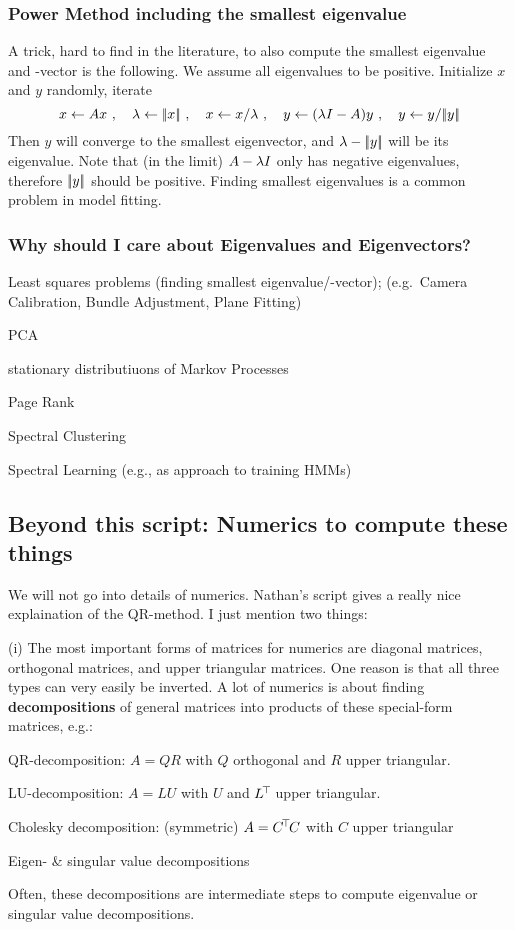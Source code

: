\subsubsection{Power Method including the smallest eigenvalue}

A trick, hard to find in the literature, to also compute the smallest
eigenvalue and -vector is the following. We assume all eigenvalues to
be positive. Initialize $x$ and $y$ randomly,
iterate
\begin{equation}
 x \gets A x ~,\quad \lambda\gets|\!|x|\!| ~,\quad x\gets x/\lambda ~,\quad y\gets(\lambda I - A)
 y ~,\quad y\gets y/|\!|y|\!|
\end{equation}
Then $y$ will converge to the smallest eigenvector, and $\lambda-|\!|y|\!|$
will be its eigenvalue. Note that (in the limit) $A-\lambda I$
only has negative eigenvalues, therefore $|\!|y|\!|$ should be
positive. Finding smallest eigenvalues is a common problem in model fitting.


\subsubsection{Why should I care about Eigenvalues and Eigenvectors?}

\begin{items}
\item Least squares problems (finding smallest eigenvalue/-vector);
(e.g.\ Camera Calibration, Bundle Adjustment, Plane Fitting)
\item PCA
\item stationary distributiuons of Markov Processes
\item Page Rank
\item Spectral Clustering
\item Spectral Learning (e.g., as approach to training HMMs)
\end{items}

\subsection{Beyond this script: Numerics to compute these things}

We will not go into details of numerics. Nathan's script gives a
really nice explaination of the QR-method. I just mention two things:

(i) The most important forms of matrices for numerics are diagonal
matrices, orthogonal matrices, and upper triangular matrices. One
reason is that all three types can very easily be inverted. A lot of
numerics is about finding \textbf{decompositions} of general matrices
into products of these special-form matrices, e.g.:
\begin{items}
\item QR-decomposition: $A=Q R$ with $Q$ orthogonal and $R$ upper
triangular.
\item LU-decomposition: $A=L U$ with $U$ and $L^{\!\top\!}$ upper triangular.
\item Cholesky decomposition: (symmetric) $A=C^{\!\top\!} C$ with $C$ upper triangular
\item Eigen- \& singular value decompositions
\end{items}
Often, these decompositions are intermediate steps to compute eigenvalue or
singular value decompositions.

